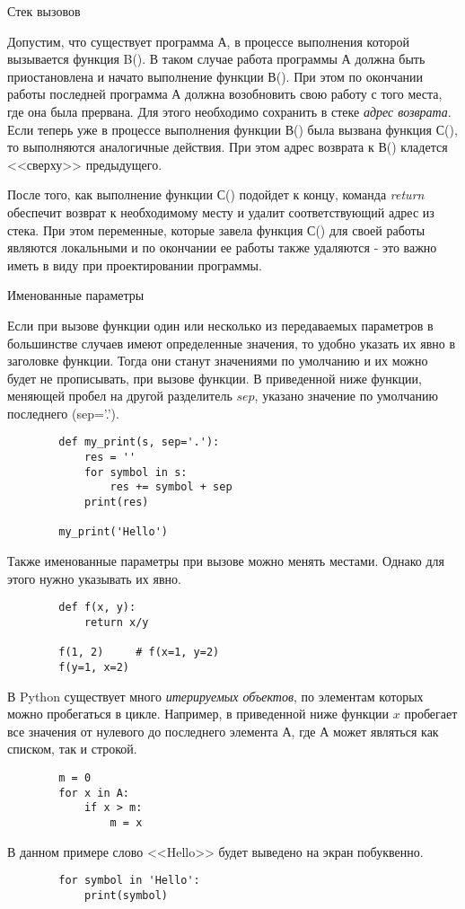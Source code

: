 \documentclass[a4paper, fleqn]{article}
\begin{document}
	Стек вызовов
	
	Допустим, что существует программа А, в процессе выполнения которой вызывается функция B(). В таком случае работа программы А должна быть приостановлена и начато выполнение функции В(). При этом по окончании работы последней программа А должна возобновить свою работу с того места, где она была прервана. Для этого необходимо сохранить в стеке \emph{адрес возврата}. 
	Если теперь уже в процессе выполнения функции В() была вызвана функция С(), то выполняются аналогичные действия. При этом адрес возврата к В() кладется <<сверху>> предыдущего. 
	
	После того, как выполнение функции С() подойдет к концу, команда \emph{return} обеспечит возврат к необходимому месту и удалит соответствующий адрес из стека. При этом переменные, которые завела функция С() для своей работы являются локальными и по окончании ее работы также удаляются - это важно иметь в виду при проектировании программы.
	 
	Именованные параметры
	
	Если при вызове функции один или несколько из передаваемых параметров  в большинстве случаев имеют определенные значения, то удобно указать их явно в заголовке функции. Тогда они станут значениями по умолчанию и их можно будет не прописывать, при вызове функции. В приведенной ниже функции, меняющей пробел на другой разделитель $sep$, указано значение по умолчанию  последнего (sep='.').
	\begin{lstlisting}
		def my_print(s, sep='.'):
			res = ''
			for symbol in s:
				res += symbol + sep
			print(res)
			
		my_print('Hello')
	\end{lstlisting}
	
	Также именованные параметры при вызове можно менять местами. Однако для этого нужно указывать их явно.
	\begin{lstlisting}
		def f(x, y):
			return x/y
			
		f(1, 2)		# f(x=1, y=2)
		f(y=1, x=2)
	\end{lstlisting}
	
	В Python существует много \emph{итерируемых объектов}, по элементам которых можно пробегаться в цикле. Например, в приведенной ниже функции $x$ пробегает все значения от нулевого до последнего элемента А, где А может являться как списком, так и строкой.
	\begin{lstlisting}
		m = 0
		for x in A:
			if x > m:
				m = x
	\end{lstlisting}
	В данном примере слово <<Hello>> будет выведено на экран побуквенно.
	\begin{lstlisting}
		for symbol in 'Hello':
			print(symbol)
	\end{lstlisting}
	
\end{document}
